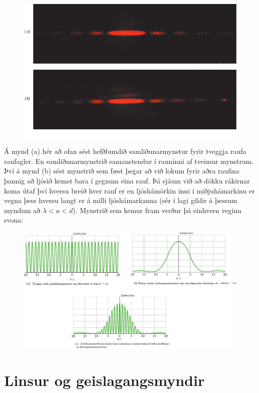 \ifdefined \wholebook \else\documentclass[oneside]{book}\usepackage{EdlBook}\graphicspath{{figures/}}
\begin{document}
\begin{figure}[H]
    \centering
    \includegraphics[scale = 0.9]{figures/jearl-walker.pdf}
\end{figure}
Á mynd (a) hér að ofan sést hefðbundið samliðunarmynstur fyrir tveggja raufa raufagler. En samliðunarmynstrið samanstendur í rauninni af tveimur mynstrum. Því á mynd (b) sést mynstrið sem fæst þegar að við lokum fyrir aðra raufina þannig að ljósið kemst bara í gegnum eina rauf. Þá sjáum við að dökku rákirnar koma útaf því hversu breið hver rauf er en ljóshámörkin inni í miðjuhámarkinu er vegna þess hversu langt er á milli ljóshámarkanna (sér í lagi gildir 
á þessum myndum að $\lambda < a < d $). Mynstrið sem kemur fram verður þá einhvern veginn svona:

\begin{figure}[H]
    \centering
    \includegraphics{figures/samlidun.pdf}
\end{figure}


\section{Linsur og geislagangsmyndir}
\end{document}
